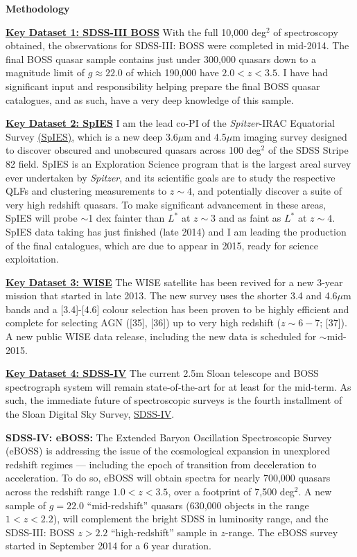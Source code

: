 \documentclass[oneside, a4paper, onecolumn, 11pt]{article}
\begin{document}
\smallskip
\smallskip
\noindent
{\bf  {\Large Methodology}}

\smallskip
\smallskip
\noindent
{\bf \underline {\large Key Dataset 1: SDSS-III BOSS}}
With the full 10,000 deg$^{2}$ of spectroscopy obtained, the
observations for SDSS-III: BOSS were completed in mid-2014. The final
BOSS quasar sample contains just under 300,000 quasars down to a
magnitude limit of $g\approx22.0$ of which 190,000 have $2.0<z<3.5$.
I have had significant input and responsibility helping prepare the
final BOSS quasar catalogues, and as such, have a very deep knowledge of
this sample.

\smallskip
\smallskip
\noindent
{\bf \underline {\large Key Dataset 2: SpIES}}
I am the lead co-PI of the {\it Spitzer}-IRAC Equatorial Survey
\href{http://ssc.spitzer.caltech.edu/warmmission/scheduling/approvedprograms/go9/90045.txt}{(SpIES)},
which is a new deep 3.6$\mu$m and 4.5$\mu$m imaging survey designed to
discover obscured and unobscured quasars across 100 deg$^{2}$ of the
SDSS Stripe 82 field.  SpIES is an Exploration Science program that is
the largest areal survey ever undertaken by {\it Spitzer}, and its
scientific goals are to study the respective QLFs and clustering
measurements to $z\sim4$, and potentially discover a suite of very
high redshift quasars.  To make significant advancement in these
areas, SpIES will probe $\sim$1 dex fainter than $L^{*}$ at $z\sim3$
and as faint as $L^{*}$ at $z\sim4$. SpIES data taking has just
finished (late 2014) and I am leading the production of 
the final catalogues, which are due to appear in 2015, 
ready for science exploitation. 

\smallskip
\smallskip
\noindent
{\bf \underline {\large Key Dataset 3: WISE}}
The WISE satellite has been revived for a new 3-year mission that
started in late 2013.  The new survey uses the shorter 3.4 and
4.6$\mu$m bands and a [3.4]-[4.6] colour selection has been proven to
be highly efficient and complete for selecting AGN ([35], [36]) up to
very high redshift ($z\sim6-7$; [37]). A new public WISE data
release, including the new data is scheduled for $\sim$mid-2015.

\smallskip
\smallskip
\noindent
{\bf \underline {\large Key Dataset 4: SDSS-IV}}
The current 2.5m Sloan telescope and BOSS spectrograph system will
remain state-of-the-art for at least for the mid-term.  As such, the
immediate future of spectroscopic surveys is the fourth installment of
the Sloan Digital Sky Survey, \href{www.sdss.org}{SDSS-IV}.

\smallskip
\smallskip
{\bf {SDSS-IV: eBOSS:}}  
The Extended Baryon Oscillation Spectroscopic Survey (eBOSS) is 
addressing the issue of the cosmological expansion in unexplored redshift regimes
--- including the epoch of transition from deceleration to
acceleration. To do so, eBOSS will obtain spectra for nearly 700,000 
quasars across the redshift range $1.0<z<3.5$, over a footprint of
7,500 deg$^2$. A new sample of $g=22.0$ ``mid-redshift''
quasars (630,000 objects in the range $1 < z < 2.2$), will complement the
bright SDSS in luminosity range, and the SDSS-III: BOSS $z>2.2$
``high-redshift'' sample in $z$-range. The eBOSS survey started in September
2014 for a 6 year duration.
\end{document}

